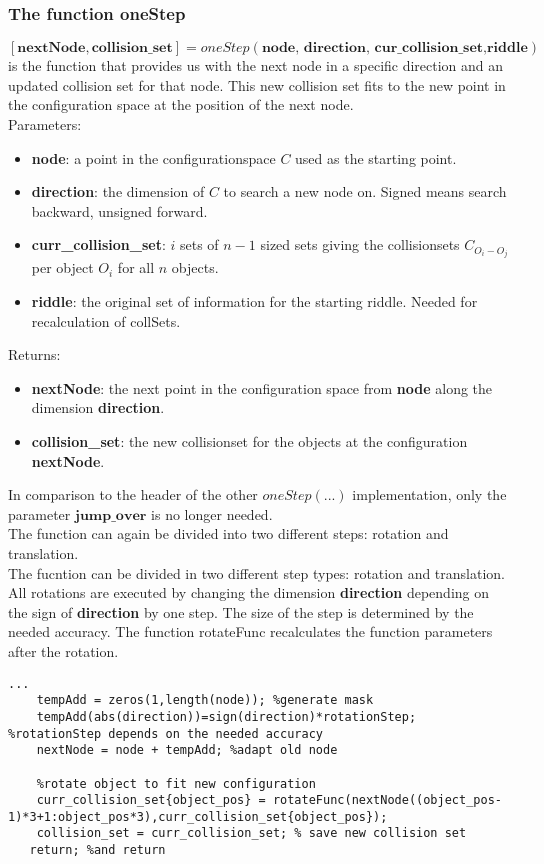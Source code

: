 \subsubsection{The function oneStep}
$[\textbf{nextNode}, \textbf{collision\_set} ]=oneStep(\textbf{node, direction, cur\_collision\_set,riddle})$ is the function that provides us with the next node in a specific direction and an updated collision set for that node. This new collision set fits to the new point in the configuration space at the position of the next node.\\
Parameters:
\begin{itemize}
\item \textbf{node}: a point in the configurationspace $C$ used as the starting point.
\item \textbf{direction}: the dimension of $C$ to search a new node on. Signed means search backward, unsigned forward. 
\item \textbf{curr\_collision\_set}: $i$ sets of $n-1$ sized sets giving the collisionsets $C_{O_i-O_j}$ per object $O_i$ for all $n$ objects.
\item \textbf{riddle}: the original set of information for the starting riddle. Needed for recalculation of collSets.
\end{itemize}
Returns:
\begin{itemize}
\item \textbf{nextNode}: the next point in the configuration space from \textbf{node} along the dimension \textbf{direction}.
\item \textbf{collision\_set}: the new collisionset for the objects at the configuration \textbf{nextNode}.
\end{itemize}
In comparison to the header of the other $oneStep(...)$ implementation, only the parameter $\textbf{jump\_over}$ is no longer needed.\\
The function can again be divided into two different steps: rotation and translation.\\
The fucntion can be divided in two different step types: rotation and translation. \\
All rotations are executed by changing the dimension \textbf{direction}  depending on the sign of \textbf{direction} by one step. The size of the step is determined 
by the needed accuracy. The function rotateFunc recalculates the function parameters after the rotation. \\
\begin{lstlisting}
...
    tempAdd = zeros(1,length(node)); %generate mask
    tempAdd(abs(direction))=sign(direction)*rotationStep; %rotationStep depends on the needed accuracy
    nextNode = node + tempAdd; %adapt old node
    
    %rotate object to fit new configuration
    curr_collision_set{object_pos} = rotateFunc(nextNode((object_pos-1)*3+1:object_pos*3),curr_collision_set{object_pos}); 
    collision_set = curr_collision_set; % save new collision set
   return; %and return
\end{lstlisting}
